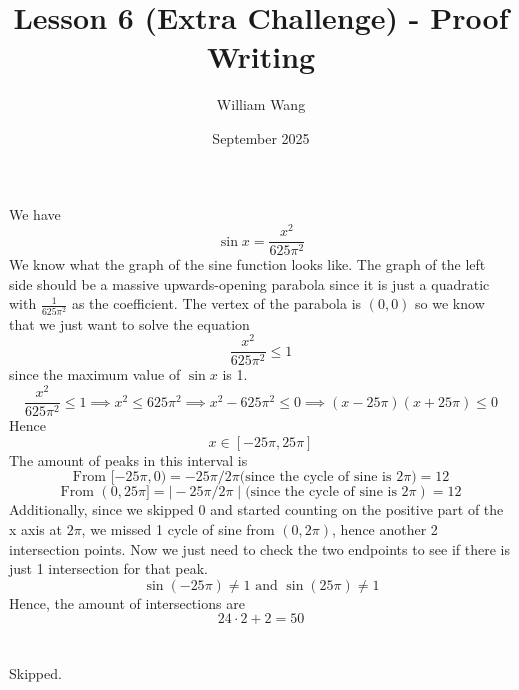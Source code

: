 \documentclass{article}
\title{Lesson 6 (Extra Challenge) - Proof Writing}
\author{William Wang}
\date{September 2025}
\begin{document}
\maketitle

\section{}
We have 
\[\sin x = \frac{x^2}{625\pi^2}\]
We know what the graph of the sine function looks like. The graph of the left side should be a massive upwards-opening parabola since it is just a quadratic with $\frac{1}{625\pi^2}$ as the coefficient. The vertex of the parabola is \((0,0)\) so we know that we just want to solve the equation
\[\frac{x^2}{625\pi^2} \le 1\]
since the maximum value of $\sin x$ is 1. 
\[\frac{x^2}{625\pi^2} \le 1 \implies x^2 \le 625\pi^2 \implies x^2-625\pi^2 \le 0 \implies (x-25\pi)(x+25\pi) \le 0\]
Hence
\[x \in [-25\pi, 25\pi]\]
The amount of peaks in this interval is 
\[\text{From } [-25\pi, 0) = -25\pi/2\pi \text{(since the cycle of sine is } 2\pi) = 12\]
\[\text{From } (0, 25\pi] = \mid -25\pi/2\pi \mid \text{(since the cycle of sine is } 2\pi) = 12\]
Additionally, since we skipped 0 and started counting on the positive part of the x axis at $2\pi$, we missed 1 cycle of sine from $(0, 2\pi)$, hence another 2 intersection points. Now we just need to check the two endpoints to see if there is just 1 intersection for that peak. 
\[\sin(-25\pi) \neq 1 \text{ and } \sin(25\pi) \neq 1\]
Hence, the amount of intersections are
\[24\cdot2 +2 = 50\]
\section{}
Skipped. 
\end{document}
